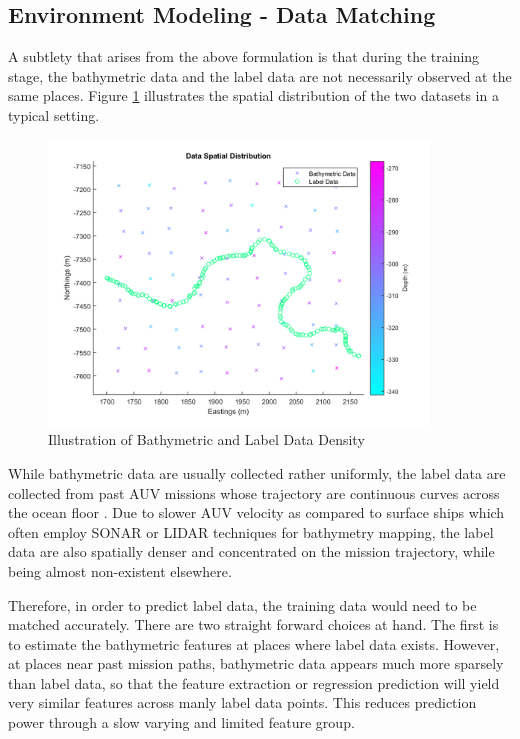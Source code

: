 		\FloatBarrier
		
		\subsection{Environment Modeling - Data Matching}
		\label{Background:OceanEnvironmentModeling:DataMatching}
		
			A subtlety that arises from the above formulation is that during the training stage, the bathymetric data and the label data are not necessarily observed at the same places. Figure \ref{Background:OceanEnvironmentModeling:Figure:illustrationBathymetricAgainstLabels} illustrates the spatial distribution of the two datasets in a typical setting.
		
			\begin{figure}[!htbp]
				\centering
					\includegraphics[width=0.9\textwidth]{Figures/illustrationBathymetricAgainstLabels.png}
				\caption{Illustration of Bathymetric and Label Data Density}
				\label{Background:OceanEnvironmentModeling:Figure:illustrationBathymetricAgainstLabels}
			\end{figure}
			
			While bathymetric data are usually collected rather uniformly, the label data are collected from past AUV missions whose trajectory are continuous curves across the ocean floor \citep{Squidle}. Due to slower AUV velocity as compared to surface ships which often employ SONAR or LIDAR techniques for bathymetry mapping, the label data are also spatially denser and concentrated on the mission trajectory, while being almost non-existent elsewhere.
			
			Therefore, in order to predict label data, the training data would need to be matched accurately. There are two straight forward choices at hand. The first is to estimate the bathymetric features at places where label data exists. However, at places near past mission paths, bathymetric data appears much more sparsely than label data, so that the feature extraction or regression prediction will yield very similar features across manly label data points. This reduces prediction power through a slow varying and limited feature group.
			
